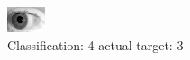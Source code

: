 \begin{figure}[h!]
\begin{center}
\includegraphics[width=0.60\columnwidth]{figures/ID270_class_4_target_3.png}
\end{center}
\caption{ Classification: 4 actual target: 3}
\label{fig:ID270_class_4_target_3}
\end{figure}
